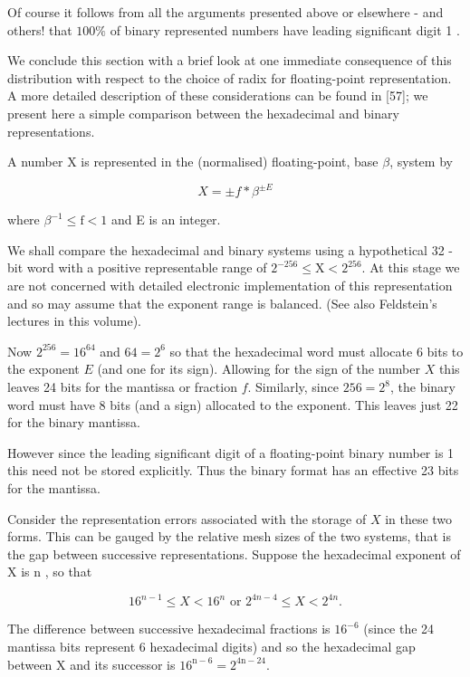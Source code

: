 \documentclass[10pt]{article}
\begin{document}
Of course it follows from all the arguments presented above or elsewhere - and others! that $100 \%$ of binary represented numbers have leading significant digit 1 .

We conclude this section with a brief look at one immediate consequence of this distribution with respect to the choice of radix for floating-point representation. A more detailed description of these considerations can be found in [57]; we present here a simple comparison between the hexadecimal and binary representations.

A number X is represented in the (normalised) floating-point, base $\beta$, system by


\begin{equation*}
X= \pm f * \beta^{ \pm E} \tag{1.2.10}
\end{equation*}


where $\beta^{-1} \leqslant \mathrm{f}<1$ and E is an integer.

We shall compare the hexadecimal and binary systems using a hypothetical 32 -bit word with a positive representable range of $2^{-256} \leqslant \mathrm{X}<2^{256}$. At this stage we are not concerned with detailed electronic implementation of this representation and so may assume that the exponent range is balanced. (See also Feldstein's lectures in this volume).

Now $2^{256}=16^{64}$ and $64=2^{6}$ so that the hexadecimal word must allocate 6 bits to the exponent $E$ (and one for its sign). Allowing for the sign of the number $X$ this leaves 24 bits for the mantissa or fraction $f$. Similarly, since $256=2^{8}$, the binary word must have 8 bits (and a sign) allocated to the exponent. This leaves just 22 for the binary mantissa.

However since the leading significant digit of a floating-point binary number is 1 this need not be stored explicitly. Thus the binary format has an effective 23 bits for the mantissa.

Consider the representation errors associated with the storage of $X$ in these two forms. This can be gauged by the relative mesh sizes of the two systems, that is the gap between successive representations. Suppose the hexadecimal exponent of X is n , so that


\begin{equation*}
16^{n-1} \leqslant X<16^{n} \text { or } 2^{4 n-4} \leqslant X<2^{4 n} . \tag{1.2.11}
\end{equation*}


The difference between successive hexadecimal fractions is $16^{-6}$ (since the 24 mantissa bits represent 6 hexadecimal digits) and so the hexadecimal gap between X and its successor is $16^{\mathrm{n}-6}=2^{4 \mathrm{n}-24}$.
\end{document}

